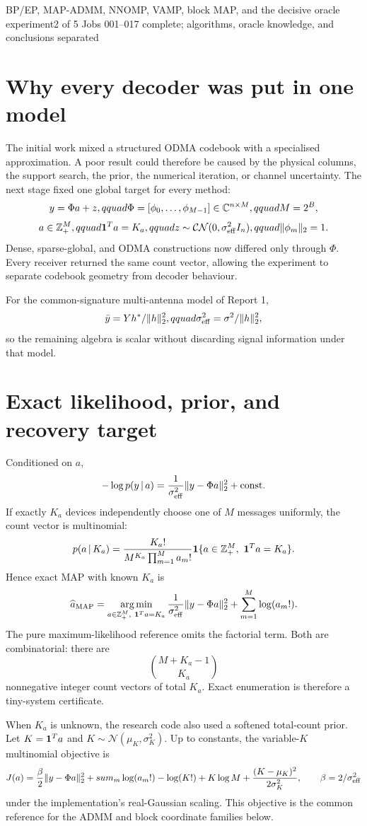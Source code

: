 \documentclass[11pt]{article}
\begin{document}
{BP/EP, MAP-ADMM, NNOMP, VAMP, block MAP, and the decisive oracle experiment}{2 of 5}
{Jobs 001--017 complete; algorithms, oracle knowledge, and conclusions separated}

\section{Why every decoder was put in one model}

The initial work mixed a structured ODMA codebook with a specialised approximation. A poor result could therefore be
caused by the physical columns, the support search, the prior, the numerical iteration, or channel uncertainty. The
next stage fixed one global target for every method:
\[
 y=\Phi a+z,qquad
 \Phi=[\phi_0,\ldots,\phi_{M-1}]\in\mathbb{C}^{n\times M},qquad
 M=2^B,
\]
\[
 a\in\mathbb{Z}_+^M,qquad \mathbf{1}^Ta=K_a,qquad
 z\sim\mathcal{CN}(0,\sigma_{\rm eff}^2I_n),qquad \|\phi_m\|_2=1.
\]
Dense, sparse-global, and ODMA constructions now differed only through $\Phi$. Every receiver returned the same count
vector, allowing the experiment to separate codebook geometry from decoder behaviour.

For the common-signature multi-antenna model of Report 1,
\[
 \bar y=Yh^*/\|h\|_2^2,qquad \sigma_{\rm eff}^2=\sigma^2/\|h\|_2^2,
\]
so the remaining algebra is scalar without discarding signal information under that model.

\section{Exact likelihood, prior, and recovery target}

Conditioned on $a$,
\[
 -\log p(y\,|\, a)=\frac{1}{\sigma_{\rm eff}^2}\|y-\Phi a\|_2^2+\text{const}.
\]
If exactly $K_a$ devices independently choose one of $M$ messages uniformly, the count vector is multinomial:
\[
 p(a\,|\, K_a)=\frac{K_a!}{M^{K_a}\prod_{m=1}^M a_m!}
 \mathbf 1\{a\in\mathbb{Z}_+^M,\ \mathbf{1}^Ta=K_a\}.
\]
Hence exact MAP with known $K_a$ is
\[
 \widehat a_{\rm MAP}=\operatorname*{arg\,min}_{a\in\mathbb{Z}_+^M,\ \mathbf{1}^Ta=K_a}
 \frac{1}{\sigma_{\rm eff}^2}\|y-\Phi a\|_2^2+
 \sum_{m=1}^M\log(a_m!).
\]
The pure maximum-likelihood reference omits the factorial term. Both are combinatorial: there are
\[
 \binom{M+K_a-1}{K_a}
\]
nonnegative integer count vectors of total $K_a$. Exact enumeration is therefore a tiny-system certificate.

When $K_a$ is unknown, the research code also used a softened total-count prior. Let $K=\mathbf{1}^Ta$ and
$K\sim\mathcal N(\mu_K,\sigma_K^2)$. Up to constants, the variable-$K$ multinomial objective is
\[
 J(a)=\frac{\beta}{2}\|y-\Phi a\|_2^2+sum_m\log(a_m!)
 -\log(K!)+K\log M+\frac{(K-\mu_K)^2}{2\sigma_K^2},
 \qquad \beta=2/\sigma_{\rm eff}^2
\]
under the implementation's real-Gaussian scaling. This objective is the common reference for the ADMM and block
coordinate families below.
\end{document}
